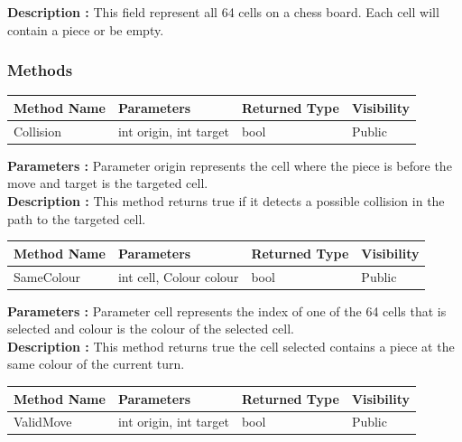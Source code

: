 \documentclass[12pt]{article}
\begin{document}
\textbf{Description :} This field represent all 64 cells on a chess board. Each cell will contain a piece or be empty.

\subsubsection{Methods}

\begin{table}[H]
    \begin{tabular}{|l|l|l|l|}
    \hline
    \rowcolor[HTML]{EFEFEF} 
    \cellcolor[HTML]{EFEFEF}\textbf{Method Name} & \textbf{Parameters}    & \textbf{Returned Type} & \textbf{Visibility} \\ \hline
    Collision                                    & int origin, int target & bool                   & Public              \\ \hline
    \end{tabular}
\end{table}

\textbf{Parameters :} Parameter origin represents the cell
where the piece is before the move and target is the targeted
cell.
\\

\textbf{Description :} This method returns true if it detects a
possible collision in the path to the targeted cell.

\begin{table}[H]
    \begin{tabular}{|l|l|l|l|}
    \hline
    \rowcolor[HTML]{EFEFEF} 
    \cellcolor[HTML]{EFEFEF}\textbf{Method Name} & \textbf{Parameters}     & \textbf{Returned Type} & \textbf{Visibility} \\ \hline
    SameColour                                   & int cell, Colour colour & bool                   & Public              \\ \hline
    \end{tabular}
\end{table}

\textbf{Parameters :} Parameter cell represents the index of one of
the 64 cells that is selected and colour is the colour of the selected cell.
\\

\textbf{Description :} This method returns true the cell selected
contains a piece at the same colour of the current turn.

\begin{table}[H]
    \begin{tabular}{|l|l|l|l|}
    \hline
    \rowcolor[HTML]{EFEFEF} 
    \cellcolor[HTML]{EFEFEF}\textbf{Method Name} & \textbf{Parameters}     & \textbf{Returned Type} & \textbf{Visibility} \\ \hline
    ValidMove                                   & int origin, int target   & bool                   & Public              \\ \hline
    \end{tabular}
\end{table}
\end{document}
